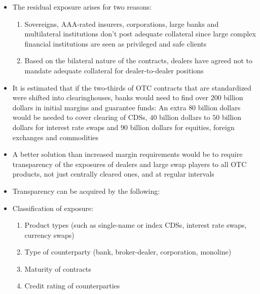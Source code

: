 \documentclass[11pt]{beamer}
\begin{document}
\begin{frame}
\begin{itemize}
\item The residual exposure arises for two reasons:
\begin{enumerate}
\item Sovereigns, AAA-rated insurers, corporations, large banks and multilateral institutions don't post adequate collateral since large complex financial institutions are seen as privileged and safe clients
\item Based on the bilateral nature of the contracts, dealers have agreed not to mandate adequate collateral for dealer-to-dealer positions
\end{enumerate}
\end{itemize}
\end{frame}

\begin{frame}
\begin{itemize}
\item It is estimated that if the two-thirds of OTC contracts that are standardized were shifted into clearinghouses, banks would need to find over $200$ billion dollars in initial margins and guarantee funds: An extra $80$ billion dollars would be needed to cover clearing of CDSs, $40$ billion dollars to $50$ billion dollars for interest rate swaps and $90$ billion dollars for equities, foreign exchanges and commodities
\item A better solution than increased margin requirements would be to require transparency of the exposures of dealers and large swap players to all OTC products, not just centrally cleared ones, and at regular intervals
\end{itemize}
\end{frame}

\begin{frame}
\begin{itemize}
\item Transparency can be acquired by the following:
\item Classification of exposure:
\begin{enumerate}
\item Product types (such as single-name or index CDSs, interest rate swaps, currency swaps)
\item Type of counterparty (bank, broker-dealer, corporation, monoline)
\item Maturity of contracts
\item Credit rating of counterparties
\end{enumerate}
\end{itemize}
\end{frame}
\end{document}
